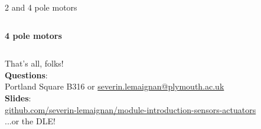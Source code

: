 \documentclass[compress]{beamer}
\makeatletter
\def\beamer@writeslidentry@miniframesoff{%
  \expandafter\beamer@ifempty\expandafter{\beamer@framestartpage}{}%
  {%
    \clearpage\beamer@notesactions%
  }
}
\newcommand*{\miniframesoff}{\let\beamer@writeslidentry=\beamer@writeslidentry@miniframesoff}
\makeatother
\begin{document}
\begin{frame}{2 and 4 pole motors}
\begin{columns}
\begin{column}{0.5\linewidth}
\begin{center}
                \textbf{4 pole motors}
            \end{center}
        \end{column}
    \end{columns}


\end{frame}



\miniframesoff
\begin{frame}{}
    \begin{center}
        \Large
        That's all, folks!\\[2em]

        \normalsize
        \textbf{Questions}:\\
        Portland Square B316 or \url{severin.lemaignan@plymouth.ac.uk} \\[1em]

        \textbf{Slides}:\\
        \href{https://github.com/severin-lemaignan/module-introduction-sensors-actuators}{\small
        github.com/severin-lemaignan/module-introduction-sensors-actuators} \\

        ...or the DLE!


    \end{center}
\end{frame}
\end{document}

